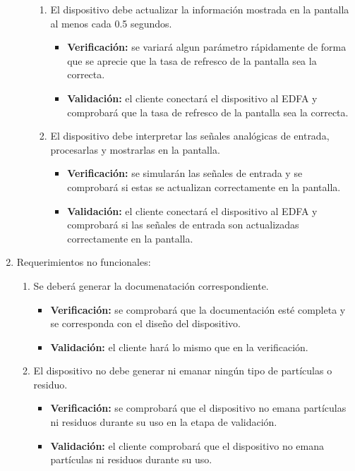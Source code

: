 \documentclass[
11pt, %
codirector, %
]{charter}
\begin{document}
\begin{enumerate}
\begin{enumerate}
\begin{enumerate}[label*=\arabic*.]
\item El dispositivo debe actualizar la información mostrada en la pantalla al menos cada 0.5 segundos.
\begin{itemize}
	\item \textbf{Verificación:} se variará algun parámetro rápidamente de forma que se aprecie que la tasa de refresco de la pantalla sea la correcta.
	\item \textbf{Validación:} el cliente conectará el dispositivo al EDFA y comprobará que la tasa de refresco de la pantalla sea la correcta.
\end{itemize}

\item El dispositivo debe interpretar las señales analógicas de entrada, procesarlas y mostrarlas en la pantalla.
\begin{itemize}
	\item \textbf{Verificación:} se simularán las señales de entrada y se comprobará si estas se actualizan correctamente en la pantalla.
	\item \textbf{Validación:} el cliente conectará el dispositivo al EDFA y comprobará si las señales de entrada son actualizadas correctamente en la pantalla.
\end{itemize}

\end{enumerate}

\end{enumerate}

\item Requerimientos no funcionales:
\begin{enumerate}
\item Se deberá generar la documenatación correspondiente.
\begin{itemize}
	\item \textbf{Verificación:} se comprobará que la documentación esté completa y se corresponda con el diseño del dispositivo.
	\item \textbf{Validación:} el cliente hará lo mismo que en la verificación.
\end{itemize}

\item El dispositivo no debe generar ni emanar ningún tipo de partículas o residuo.
\begin{itemize}
	\item \textbf{Verificación:} se comprobará que el dispositivo no emana partículas ni residuos durante su uso en la etapa de validación.
	\item \textbf{Validación:} el cliente comprobará que el dispositivo no emana partículas ni residuos durante su uso.
\end{itemize}


\end{enumerate}
\end{enumerate}
\end{document}
